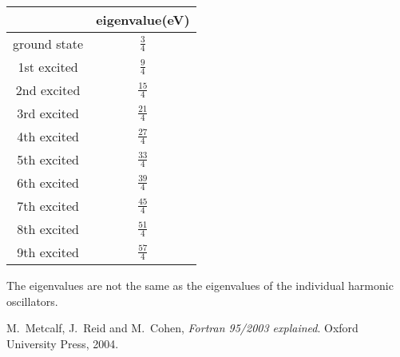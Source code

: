 \documentclass[12pt]{article}
\begin{document}
\begin{table}[h]
\centering
\begin{tabular}{cc}
\hline
             & eigenvalue(eV) \\ \hline\hline  
ground state & {$\frac{3}{4}$}         \\ [1ex]
1st excited  & {$\frac{9}{4}$}        \\ [1ex]
2nd excited  & {$\frac{15}{4}$}         \\ [1ex]
3rd excited  & {$\frac{21}{4}$}         \\ [1ex]
4th excited  & {$\frac{27}{4}$}        \\ [1ex]
5th excited  & {$\frac{33}{4}$}         \\ [1ex]
6th excited  & {$\frac{39}{4}$}         \\ [1ex]
7th excited  & {$\frac{45}{4}$}        \\ [1ex]
8th excited  & {$\frac{51}{4}$}        \\ [1ex]
9th excited  & {$\frac{57}{4}$}       \\  \hline
\end{tabular}
\end{table}

The eigenvalues are not the same as the eigenvalues of the individual harmonic oscillators. 



\begin{thebibliography}{}


 M.\ Metcalf, J.\ Reid and M.\ Cohen, {\it Fortran 95/2003 explained}. Oxford University Press, 2004.
 

\end{thebibliography}
\end{document}
